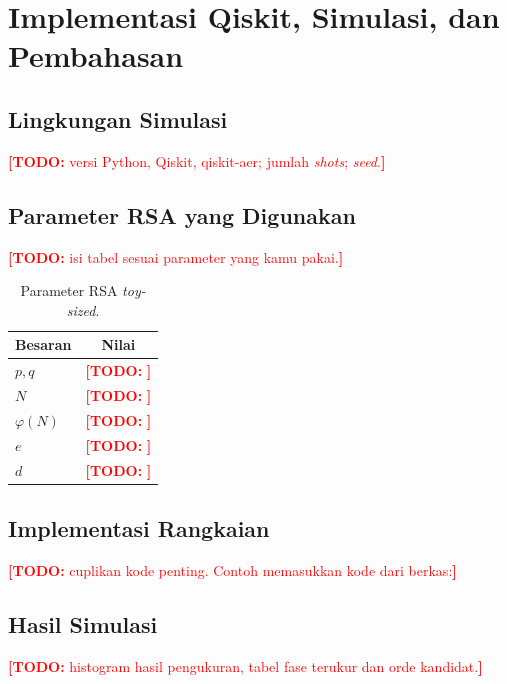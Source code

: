 \documentclass[11pt,a4paper]{article}
\newcommand{\todo}[1]{\textcolor{red}{\textbf{[TODO:} #1\textbf{]}}}
\begin{document}
\section{Implementasi Qiskit, Simulasi, dan Pembahasan}\label{sec:implementasi}

\subsection{Lingkungan Simulasi}
\todo{versi Python, Qiskit, qiskit-aer; jumlah \emph{shots}; \emph{seed}.}

\subsection{Parameter RSA yang Digunakan}
\todo{isi tabel sesuai parameter yang kamu pakai.}
\begin{table}[h]
  \centering
  \caption{Parameter RSA \emph{toy-sized}.}
  \label{tab:rsa}
  \begin{tabular}{lc}
    \toprule
    Besaran & Nilai \\
    \midrule
    $p, q$        & \todo{} \\
    $N$           & \todo{} \\
    $\varphi(N)$  & \todo{} \\
    $e$           & \todo{} \\
    $d$           & \todo{} \\
    \bottomrule
  \end{tabular}
\end{table}

\subsection{Implementasi Rangkaian}
\todo{cuplikan kode penting. Contoh memasukkan kode dari berkas:}
% 

\subsection{Hasil Simulasi}
\todo{histogram hasil pengukuran, tabel fase terukur dan orde kandidat.}
\end{document}
